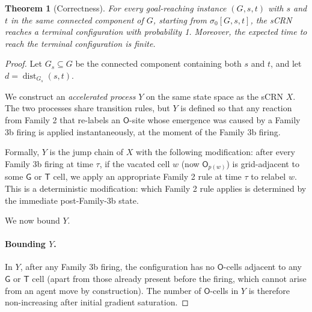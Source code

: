 \documentclass[11pt]{article}
\theoremstyle{plain}
\newtheorem{theorem}{Theorem}
\theoremstyle{definition}
\theoremstyle{remark}
\DeclareMathOperator{\dist}{dist}
\begin{document}
\begin{theorem}[Correctness]
\label{thm:correctness}
For every goal-reaching instance $(G, s, t)$ with $s$ and $t$ in the same connected component of $G$, starting from $\sigma_0[G, s, t]$, the sCRN reaches a terminal configuration with probability 1. Moreover, the expected time to reach the terminal configuration is finite.
\end{theorem}

\begin{proof}
Let $G_s \subseteq G$ be the connected component containing both $s$ and $t$, and let $d = \dist_{G_s}(s, t)$.

We construct an \emph{accelerated process} $Y$ on the same state space as the sCRN $X$. The two processes share transition rules, but $Y$ is defined so that any reaction from Family 2 that re-labels an $\mathsf{O}$-site whose emergence was caused by a Family 3b firing is applied instantaneously, at the moment of the Family 3b firing.

Formally, $Y$ is the jump chain of $X$ with the following modification: after every Family 3b firing at time $\tau$, if the vacated cell $w$ (now $\mathsf{O}_{p(w)}$) is grid-adjacent to some $\mathsf{G}$ or $\mathsf{T}$ cell, we apply an appropriate Family 2 rule at time $\tau$ to relabel $w$. This is a deterministic modification: which Family 2 rule applies is determined by the immediate post-Family-3b state.

We now bound $Y$.

\paragraph{Bounding $Y$.} In $Y$, after any Family 3b firing, the configuration has no $\mathsf{O}$-cells adjacent to any $\mathsf{G}$ or $\mathsf{T}$ cell (apart from those already present before the firing, which cannot arise from an agent move by construction). The number of $\mathsf{O}$-cells in $Y$ is therefore non-increasing after initial gradient saturation.


\end{proof}
\end{document}
